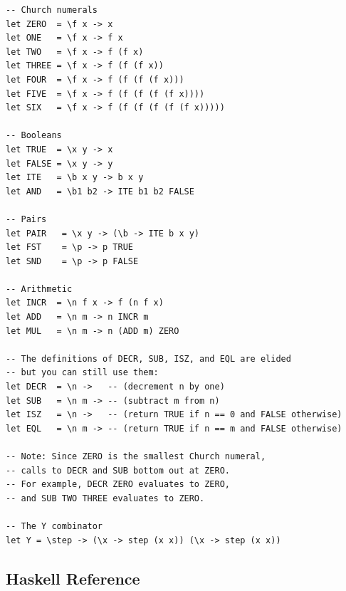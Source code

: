 \documentclass[addpoints]{exam}
\begin{document}
\begin{verbatim}
-- Church numerals
let ZERO  = \f x -> x
let ONE   = \f x -> f x
let TWO   = \f x -> f (f x)
let THREE = \f x -> f (f (f x))
let FOUR  = \f x -> f (f (f (f x)))
let FIVE  = \f x -> f (f (f (f (f x))))
let SIX   = \f x -> f (f (f (f (f (f x)))))

-- Booleans
let TRUE  = \x y -> x
let FALSE = \x y -> y
let ITE   = \b x y -> b x y
let AND   = \b1 b2 -> ITE b1 b2 FALSE

-- Pairs
let PAIR   = \x y -> (\b -> ITE b x y)
let FST    = \p -> p TRUE
let SND    = \p -> p FALSE

-- Arithmetic
let INCR  = \n f x -> f (n f x)
let ADD   = \n m -> n INCR m
let MUL   = \n m -> n (ADD m) ZERO

-- The definitions of DECR, SUB, ISZ, and EQL are elided
-- but you can still use them:
let DECR  = \n ->   -- (decrement n by one)
let SUB   = \n m -> -- (subtract m from n)
let ISZ   = \n ->   -- (return TRUE if n == 0 and FALSE otherwise)
let EQL   = \n m -> -- (return TRUE if n == m and FALSE otherwise)

-- Note: Since ZERO is the smallest Church numeral,
-- calls to DECR and SUB bottom out at ZERO.
-- For example, DECR ZERO evaluates to ZERO,
-- and SUB TWO THREE evaluates to ZERO.

-- The Y combinator
let Y = \step -> (\x -> step (x x)) (\x -> step (x x))
\end{verbatim}

\newpage

\subsection*{Haskell Reference}
\end{document}
